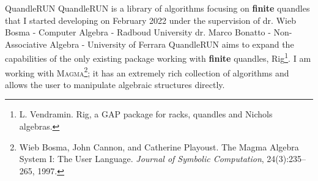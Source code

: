 \begin{frame}{QuandleRUN}
QuandleRUN is a library of algorithms focusing on \textbf{finite} quandles that I started developing on February 2022 under the supervision of\newline\newline
dr. Wieb Bosma - Computer Algebra - Radboud University \newline
dr. Marco Bonatto - Non-Associative Algebra - University of Ferrara\newline\newline
QuandleRUN aims to expand the capabilities of the only existing package working with \textbf{finite} quandles, Rig\footnote{\footnotesize{L. Vendramin. Rig, a GAP package for racks, quandles and Nichols algebras.}}. \newline\newline
I am working with \textsc{Magma}\footnote{Wieb Bosma, John Cannon, and Catherine Playoust.  The Magma Algebra System I: The User Language. \textit{Journal of Symbolic Computation}, 24(3):235–265, 1997. }; it has an extremely rich collection of algorithms and allows the user to manipulate algebraic structures directly.

\end{frame} 





